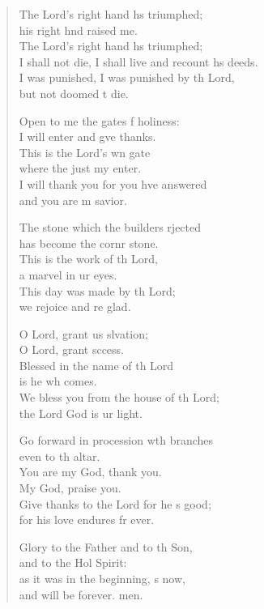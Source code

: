 \begin{verse}
\begin{patverse}
    The Lord’s right hand hs triumphed;\Med\\
    his right hnd raised me.\\
    The Lord’s right hand hs triumphed;\Med\\
    I shall not die, I shall live and recount h\pointup{\i}s deeds.\\
    I was punished, I was punished by th Lord,\Med\\
    but not doomed t die.

    Open to me the gates f holiness:\Med\\
    I will enter and g\pointup{\i}ve thanks.\\
    This is the Lord’s wn gate\Med\\
    where the just my enter.\\
    I will thank you for you hve answered\Med\\
    and you are m savior.

    The stone which the builders rjected\Med\\
    has become the cornr stone.\\
    This is the work of th Lord,\Med\\
    a marvel in ur eyes.\\
    This day was made by th Lord;\Med\\
    we rejoice and re glad.

    O Lord, grant us slvation;\Med\\
    O Lord, grant sccess.\\
    Blessed in the name of th Lord\Med\\
    is he wh comes.\\
    We bless you from the house of th Lord;\Med\\
    the Lord God is ur light.

    Go forward in procession w\pointup{\i}th branches\Med\\
    even to th altar.\\
    You are my God,  thank you.\Med\\
    My God,  praise you.\\
    Give thanks to the Lord for he \pointup{\i}s good;\Med\\
    for his love endures fr ever.

    Glory to the Father and to th Son,\Med\\
    and to the Hol Spirit:\\
    as it was in the beginning, \pointup{\i}s now,\Med\\
    and will be forever. men.
  \end{patverse}
\end{verse}
